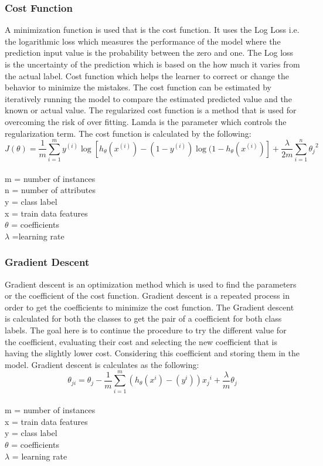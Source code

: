 \documentclass{book}
\begin{document}
    	\subsubsection{Cost Function}
    		A minimization function is used that is the cost function. It uses the 
    		Log Loss i.e. the logarithmic loss which measures the performance 
    		of the model where the prediction input value is the probability 
    		between the zero and one. The Log loss is the uncertainty of the 
    		prediction which is based on the how  much  it  varies  from  the 
    		actual label. Cost function which helps the learner to correct or 
    		change the behavior to minimize the mistakes. The cost function 
    		can be estimated by iteratively running the model to compare the 
    		estimated predicted value and the known or actual  value. The 
    		regularized cost function is a method that is used for overcoming 
    		the risk of over fitting.  Lamda  is  the  parameter  which  controls 
    		the regularization term. The  cost function  is calculated  by  the 
    		following:
    		\[ J(\theta) = \frac{1}{m}\sum_{i=1}^{m} y^{(i)} \log[h_\theta(x^{(i)}) - (1-y^{(i)}) \log(1-h_\theta(x^{(i)})] + \frac{\lambda}{2m}\sum_{i=1}^{n}{\theta_j}^2 \] \\
    		m = number of instances \\
    		n = number of attributes \\
    		y = class label \\
    		x = train data features\\
    		$\theta$ = coefficients \\ 
    		$\lambda$ =learning rate
    	
    	
    	\subsubsection{Gradient Descent}
    		Gradient descent is an optimization method which is used to find 
    		the parameters or  the  coefficient  of  the  cost  function.  Gradient 
    		descent is  a  repeated  process  in  order  to  get  the  coefficients  to 
    		minimize the cost function. The  Gradient  descent  is  calculated 
    		for both the classes to get the pair of a coefficient for both class 
    		labels. The goal here is to continue the procedure to try the different 
    		value for the coefficient, evaluating their cost  and selecting the new coefficient that is having the slightly lower cost. Considering this coefficient and storing them in the model. Gradient descent 
    		is calculates as the following:
    		\[ \theta_{ji} = \theta_j - \frac{1}{m}\sum_{i=1}^{m}(h_\theta(x^i)-(y^i)) {x_j}^i + \frac{\lambda}{m} \theta_j \]\\
    		m = number of instances \\
    		x = train data features \\
    		y = class label \\
    		$\theta$ = coefficients \\
    		$\lambda$ = learning rate 
    		
\end{document}
